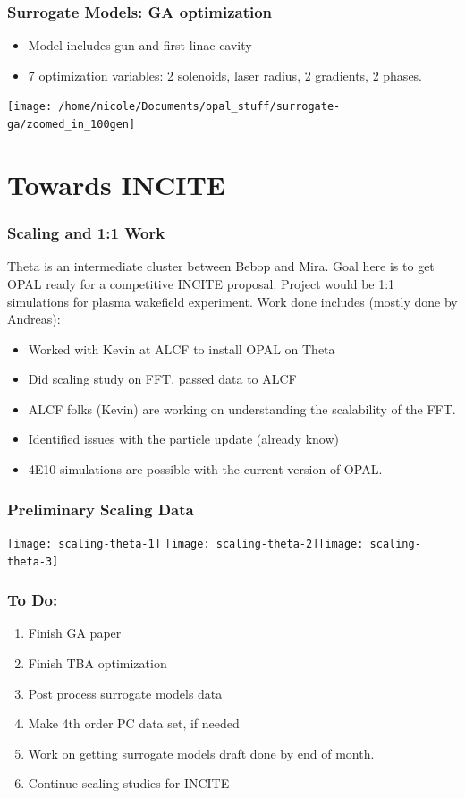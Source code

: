\documentclass[professionalfonts,t]{beamer}
\begin{document}
\begin{frame}[t]
	\frametitle{Surrogate Models: GA optimization}
	\centering
				\begin{itemize}
				\item Model includes gun and first linac cavity
				\item 7 optimization variables: 2 solenoids, laser radius, 2 gradients, 2 phases.  
			\end{itemize}
		\texttt{[image: /home/nicole/Documents/opal\_stuff/surrogate-ga/zoomed\_in\_100gen]}
\end{frame}


\section{Towards INCITE}
\begin{frame}
	\frametitle{Scaling and 1:1 Work }
	Theta is an intermediate cluster between Bebop and Mira.
	Goal here is to get OPAL ready for a competitive INCITE proposal. 
	Project would be 1:1 simulations for plasma wakefield experiment.
	Work done includes (mostly done by Andreas):
	
	\begin{itemize}
		\item Worked with Kevin at ALCF to install OPAL on Theta
		\item Did scaling study on FFT, passed data to ALCF
		\item ALCF folks (Kevin) are working on understanding the scalability of the FFT.
		\item Identified issues with the particle update (already know)
		\item 4E10 simulations are possible with the current version of OPAL.
	\end{itemize}
\end{frame}

\begin{frame}[t]
	\frametitle{Preliminary Scaling Data}
	\centering
		\texttt{[image: scaling-theta-1]}
		\texttt{[image: scaling-theta-2]}\texttt{[image: scaling-theta-3]}
\end{frame}

\begin{frame}
	\frametitle{To Do:}
	\begin{enumerate}
		\item Finish GA paper
		\item Finish TBA optimization
		\item Post process surrogate models data
		\item Make 4th order PC data set, if needed
		\item Work on getting surrogate models draft done by end of month.
		\item Continue scaling studies for INCITE
	\end{enumerate}
\end{frame}
\end{document}
